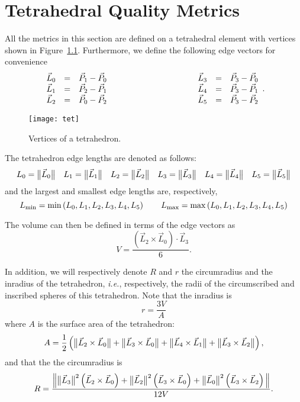 \chapter{Tetrahedral Quality Metrics}

All the metrics in this section are defined on a tetrahedral element with vertices
shown in Figure~\ref{f:tet}. Furthermore, we define the following edge vectors for
convenience
\begin{equation*}
\begin{array}{lcl}
\vec L_0 &=& \vec P_1 - \vec P_0\\
\vec L_1 &=& \vec P_2 - \vec P_1\\
\vec L_2 &=& \vec P_0 - \vec P_2
\end{array}\rule{10em}{0pt}
\begin{array}{lcl}
\vec L_3 &=& \vec P_3 - \vec P_0\\
\vec L_4 &=& \vec P_3 - \vec P_1\\
\vec L_5 &=& \vec P_3 - \vec P_2
\end{array}.
\end{equation*}

\begin{figure}[htb]
  \begin{center}
    \texttt{[image: tet]}
    \caption{Vertices of a tetrahedron.%
                                                                  \label{f:tet}}
  \end{center}
\end{figure}

The tetrahedron edge lengths are denoted as follows:
\[
L_0 = \big\lVert{\vec L_0}\big\rVert\quad
L_1 = \big\lVert{\vec L_1}\big\rVert\quad
L_2 = \big\lVert{\vec L_2}\big\rVert\quad
L_3 = \big\lVert{\vec L_3}\big\rVert\quad
L_4 = \big\lVert{\vec L_4}\big\rVert\quad
L_5 = \big\lVert{\vec L_5}\big\rVert
\]
and the largest and smallest edge lengths are, respectively,
\[
L_{\min} = \min\left(L_0, L_1, L_2, L_3, L_4, L_5\right)
  \rule{2em}{0pt}
L_{\max} = \max\left(L_0, L_1, L_2, L_3, L_4, L_5\right)
\]

The volume can then be defined in terms of the edge vectors as
\begin{equation*}
V = \frac{\left(\vec L_2\times\vec L_0\right)\cdot\vec L_3 }{6}.
\end{equation*}

In addition, we will respectively denote $R$ and $r$ the circumradius
and the inradius of the tetrahedron, \emph{i.e.}, respectively, the radii
of the circumscribed and inscribed spheres of this tetrahedron.
Note that the inradius is
\[
 r = \frac { 3V } { A }
\]
where $A$ is the  surface area of the tetrahedron:
\[
A = \frac{1}{2} \left(
      \big\lVert{\vec L_2 \times \vec L_0}\big\rVert + 
      \big\lVert{\vec L_3 \times \vec L_0}\big\rVert + 
      \big\lVert{\vec L_4 \times \vec L_1}\big\rVert + 
      \big\lVert{\vec L_3 \times \vec L_2}\big\rVert  \right),
\]
and that the the circumradius is
\[
 R = \frac {\Big\lVert
   \big\lVert{\vec L_3}\big\rVert^2 \left( \vec L_2 \times \vec L_0 \right) + 
   \big\lVert{\vec L_2}\big\rVert^2 \left( \vec L_3 \times \vec L_0 \right) + 
   \big\lVert{\vec L_0}\big\rVert^2 \left( \vec L_3 \times \vec L_2 \right)
   \Big\rVert}{12 V }. 
\]

